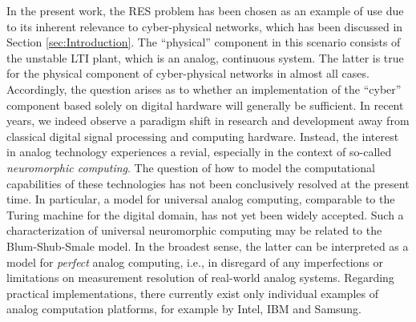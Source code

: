 \documentclass[conference]{IEEEtran}
\newcommand{\revision}[1]{}
\begin{document}
	In the present work, the RES problem has been chosen as an example of use due to its inherent relevance to cyber-physical networks,
	which has been discussed in Section \ref{sec:Introduction}. The ``physical'' component in this scenario consists of the unstable LTI plant, which is an analog, 
	continuous system. The latter is true for the physical component of cyber-physical networks in almost all cases. Accordingly, the question arises as to 
	whether an implementation of the ``cyber'' component based solely on digital hardware will generally be sufficient.
	In recent years, we indeed observe a paradigm shift in research and development away from classical digital signal processing and computing hardware.
	Instead, the interest in analog technology experiences a revial, especially in the context of so-called \emph{neuromorphic computing}. 
	The question of how to model the computational capabilities of these technologies has not been conclusively resolved at the present time.
	In particular, a model for universal analog computing, comparable to the Turing machine for the digital domain, has not yet been widely accepted. 
	Such a characterization of universal neuromorphic computing may be related to the Blum-Shub-Smale model. In the broadest sense, the latter can be
	interpreted as a model for \emph{perfect} analog computing, i.e., in disregard of any imperfections or limitations on measurement resolution of real-world analog systems.
	Regarding practical implementations, there currently exist only individual examples of analog computation platforms, for example by Intel, IBM and Samsung.
	\revision{Provide a source for the last statement.}
\end{document}
